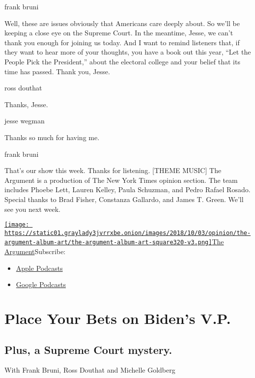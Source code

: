frank bruni

Well, these are issues obviously that Americans care deeply about. So
we'll be keeping a close eye on the Supreme Court. In the meantime,
Jesse, we can't thank you enough for joining us today. And I want to
remind listeners that, if they want to hear more of your thoughts, you
have a book out this year, ``Let the People Pick the President,'' about
the electoral college and your belief that its time has passed. Thank
you, Jesse.

ross douthat

Thanks, Jesse.

jesse wegman

Thanks so much for having me.

frank bruni

That's our show this week. Thanks for listening. {[}THEME MUSIC{]} The
Argument is a production of The New York Times opinion section. The team
includes Phoebe Lett, Lauren Kelley, Paula Schuzman, and Pedro Rafael
Rosado. Special thanks to Brad Fisher, Constanza Gallardo, and James T.
Green. We'll see you next week.

\href{https://www.nytimes3xbfgragh.onion/column/the-argument}{\texttt{[image: https://static01.graylady3jvrrxbe.onion/images/2018/10/03/opinion/the-argument-album-art/the-argument-album-art-square320-v3.png]}The
Argument}Subscribe:

\begin{itemize}
\tightlist
\item
  \href{https://itunes.apple.com/us/podcast/id1438024613}{Apple
  Podcasts}
\item
  \href{https://www.google.com/podcasts?feed=aHR0cHM6Ly9yc3MuYXJ0MTkuY29tL3RoZS1hcmd1bWVudA\%3D\%3D}{Google
  Podcasts}
\end{itemize}

\hypertarget{place-your-bets-on-bidens-vp-1}{%
\section{Place Your Bets on Biden's
V.P.}\label{place-your-bets-on-bidens-vp-1}}

\hypertarget{plus-a-supreme-court-mystery-1}{%
\subsection{Plus, a Supreme Court
mystery.}\label{plus-a-supreme-court-mystery-1}}

With Frank Bruni, Ross Douthat and Michelle Goldberg


